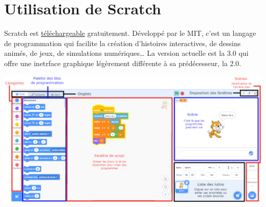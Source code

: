 \bigskip


\section{Utilisation de Scratch}

   Scratch est \href{https://scratch.mit.edu/download}{\blue téléchargeable} gratuitement. Développé par le MIT, c'est un langage de programmation qui facilite la création d’histoires interactives, de dessins animés, de jeux, de simulations numériques\dots{} La version actuelle est la 3.0 qui offre une inetrface graphique légèrement différente à sa prédécesseur, la 2.0. \medskip

\hspace*{-8mm}
\includegraphics[width=18.5cm]{Transversal/Images/T15_cours_interface} 
\smallskip

